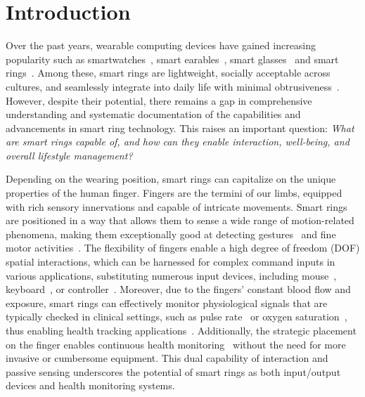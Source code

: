 
\section{Introduction}
Over the past years, wearable computing devices have gained increasing popularity such as smartwatches~\cite{king2018survey}, smart earables~\cite{roddiger2022sensing}, smart glasses~\cite{wang2024g} and smart rings~\cite{rissanen2013subtle}. 
Among these, smart rings are lightweight, socially
acceptable across cultures, and seamlessly integrate into daily life with minimal obtrusiveness~\cite{bilius2023could, rissanen2013subtle}.
However, despite their potential, there remains a gap in comprehensive understanding and systematic documentation of the capabilities and advancements in smart ring technology. This raises an important question: \textit{What are smart rings capable of, and how can they enable interaction, well-being, and overall lifestyle management?}


Depending on the wearing position, smart rings can capitalize on the unique properties of the human finger. Fingers are the termini of our limbs, equipped with rich sensory innervations and capable of intricate movements. 
Smart rings are positioned in a way that allows them to sense a wide range of motion-related phenomena, making them exceptionally good at detecting gestures~\cite{vatavu2021gesturing} and fine motor activities~\cite{rissanen2013subtle}. 
The flexibility of fingers enable a high degree of freedom (DOF) spatial interactions, which can be harnessed for complex command inputs in various applications, substituting numerous input devices, including mouse~\cite{chen2014mobiring, waghmare2023zring, shen2024mousering}, keyboard~\cite{liang2023drg, gu2020qwertyring, li2023ringvkb, nirjon2015typingring}, or controller~\cite{yau2020subtle, yeo2019wrist}. 
Moreover, due to the fingers' constant blood flow and exposure, smart rings can effectively monitor physiological signals that are typically checked in clinical settings, such as pulse rate~\cite{boukhayma2021ring, haddad2021ear, dong2021cloud, mahmud2018sensoring} or oxygen saturation~\cite{magno2019self}, thus enabling health tracking applications~\cite{rajput2023assessment, usman2019analyzing, halkola2019towards}.
Additionally, the strategic placement on the finger enables continuous health monitoring~\cite{wongtaweesup2023using, joseph2022integrated} without the need for more invasive or cumbersome equipment. 
This dual capability of interaction and passive sensing underscores the potential of smart rings as both input/output devices and health monitoring systems.

